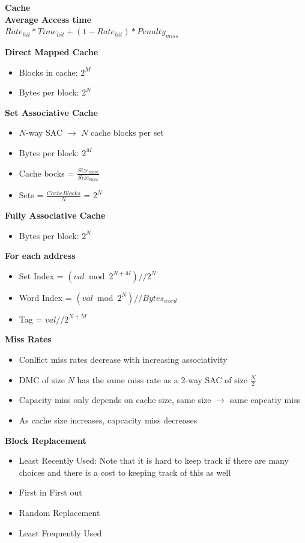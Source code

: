 \documentclass[a4paper]{article} \usepackage[backend=biber, style=numeric, sorting=none]{biblatex}
\begin{document}
\begin{multicols*}{4}
{\small\textbf{Cache}}
\\ \textbf{{Average Access time}}
\\ $Rate_{hit} * Time_{hit} + (1 - Rate_{hit}) * Penalty_{miss}$

\textbf{{Direct Mapped Cache}}
\begin{itemize}[leftmargin=*]
\itemsep -0.5em
\item Blocks in cache: $2^M$
\item Bytes per block: $2^N$
\end{itemize}

\textbf{{Set Associative Cache}}
\begin{itemize}[leftmargin=*]
\itemsep -0.5em
\item $N$-way SAC $\rightarrow$ $N$ cache blocks per set
\item Bytes per block: $2^M$
\item Cache bocks = $\frac{Size_{cache}}{Size_{block}}$
\item Sets = $\frac{CacheBlocks}{N}$ = $2^N$
\end{itemize}

\textbf{{Fully Associative Cache}}
\begin{itemize}[leftmargin=*]
\itemsep -0.5em
\item Bytes per block: $2^N$
\end{itemize}

\textbf{{For each address}}
\begin{itemize}[leftmargin=*]
\itemsep -0.5em
\item Set Index =  $(val \bmod 2^{N + M}) // 2^N$
\item Word Index =  $(val \bmod 2^{N}) // Bytes_{word}$
\item Tag =  $val // 2^{N + M}$
\end{itemize}

\textbf{{Miss Rates}}
\begin{itemize}[leftmargin=*]
\itemsep -0.5em
\item Conlfict miss rates decrease with increasing associativity
\item DMC of size $N$ has the same miss rate as a 2-way SAC of size $\frac{N}{2}$
\item Capacity miss only depends on cache size, same size $\rightarrow$ same capcatiy miss
\item As cache size increases, capcacity miss decreases
\end{itemize}

\textbf{{Block Replacement}}
\begin{itemize}[leftmargin=*]
\itemsep -0.5em
\item Least Recently Used: Note that it is hard to keep track if there are many choices and there is a cost to keeping track of this as well
\item First in First out
\item Random Replacement
\item Least Frequently Used
\end{itemize}


\end{multicols*}
\end{document}
